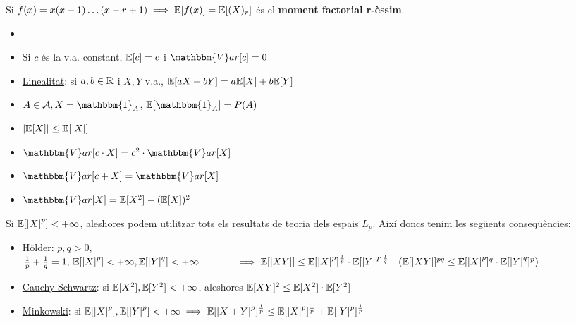 \begin{defi}
  Si $f(x) = x(x-1)\ldots(x-r+1) \implies \mathbb{E}[f(x)] = \mathbb{E}[(X)_r]$ és el \textbf{moment factorial r-èssim}.
\end{defi}

\begin{prop}
  \begin{itemize}
      \item []
      \item Si $c$ és la v.a. constant, $\mathbb{E}[c] = c$ i $\mathbbm{V}ar[c] = 0$
      \item \underline{Linealitat}: si $a, b \in \mathbb{R}$ i $X, Y$ v.a., $\mathbb{E}[aX + bY] = a\mathbb{E}[X] + b\mathbb{E}[Y]$
      \item $A \in \mathcal{A}, X = \mathbbm{1}_{A}$, $\E[\mathbbm{1}_{A}] = P(A)$
      \item $\left\vert \mathbb{E}[X] \right\vert \leq \mathbb{E}[\left\vert X \right\vert]$
      \item $\mathbbm{V}ar[c\cdot X] = c^{2}\cdot \mathbbm{V}ar[X]$
      \item $\mathbbm{V}ar[c+X] = \mathbbm{V}ar[X]$
      \item $\mathbbm{V}ar[X] = \E[X^{2}] - (\E[X])^{2}$
  \end{itemize}
\end{prop}

\newpage

\begin{obs}
  Si $\mathbb{E}[\left\vert X \right\vert^{p}] < +\infty$, aleshores podem utilitzar tots els resultats de teoria dels espais $L_{p}$. Així doncs tenim les següents conseqüències:
  
  \begin{itemize}
      \item \underline{Hölder}: $p, q > 0$, $\frac{1}{p} + \frac{1}{q} = 1, \, \mathbb{E}[\left\vert X \right\vert^{p}] < +\infty, \mathbb{E}[\left\vert Y \right\vert^{q}] < +\infty \\ \- \hspace{1.25cm}\implies \mathbb{E}[\left\vert XY \right\vert] \leq \mathbb{E}[\left\vert X \right\vert^{p}]^{\frac{1}{p}}\cdot \mathbb{E}[\left\vert Y \right\vert^{q}]^{\frac{1}{q}} \quad (\mathbb{E}[\left\vert XY \right\vert]^{pq} \leq \mathbb{E}[\left\vert X \right\vert^{p}]^{q}\cdot \mathbb{E}[\left\vert Y \right\vert^{q}]^{p})$
      
      \item \underline{Cauchy-Schwartz}: si $\mathbb{E}[X^{2}], \mathbb{E}[Y^2] < +\infty$, aleshores $\mathbb{E}[XY]^{2} \leq \mathbb{E}[X^{2}]\cdot \mathbb{E}[Y^{2}]$
      \item \underline{Minkowski}: si $\mathbb{E}[\left\vert X \right\vert^{p}], \mathbb{E}[\left\vert Y \right\vert^{p}] < +\infty \implies \mathbb{E}[\left\vert X+Y \right\vert^{p}]^{\frac{1}{p}} \leq \mathbb{E}[\left\vert X \right\vert^{p}]^{\frac{1}{p}} + \mathbb{E}[\left\vert Y \right\vert^{p}]^{\frac{1}{p}}$
  \end{itemize}
\end{obs}

